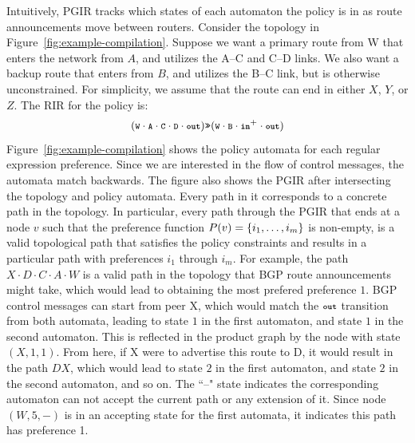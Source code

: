 Intuitively, PGIR tracks which states of each automaton the policy is in as route announcements move between routers.
%
Consider the topology in Figure~\ref{fig:example-compilation}. Suppose we want a primary route from W that enters the network from $A$, and utilizes the A--C and C--D links. We also want a backup route that enters from $B$, and utilizes the B--C link, but is otherwise unconstrained. For simplicity, we assume that the route can end in either $X$, $Y$, or $Z$. The RIR for the policy is:
%
$$(\CD{W} \cdot \CD{A} \cdot \CD{C} \cdot \CD{D} \cdot \Out) \Prefer (\CD{W} \cdot \CD{B} \cdot \In^+ \cdot \Out)$$
%
Figure~\ref{fig:example-compilation} shows the policy automata for each regular expression preference. Since we are interested in the flow of control messages, the automata match backwards.
%
The figure also shows the PGIR after intersecting the topology and policy automata. Every path in it corresponds to a concrete path in the topology. In particular, every path through the PGIR that ends at a node $v$ such that the preference function $P(v) = \{ i_1, \dots, i_m \} $ is non-empty, is a valid topological path that satisfies the policy constraints and results in a particular path with preferences $i_1$ through $i_m$.
%
For example, the path $X \cdot D \cdot C \cdot A \cdot W$ is a valid path in the topology that BGP route announcements might take, which would lead to obtaining the most prefered preference $1$.
BGP control messages can start from peer X, which would match the $\Out$ transition from both automata, leading to state $1$ in the first automaton, and state $1$ in the second automaton. This is reflected in the product graph by the node with state $(X,1,1)$. From here, if X were to advertise this route to D, it would result in the path $D X$, which would lead to state $2$ in the first automaton, and state $2$ in the second automaton, and so on.
%
The ``--" state indicates the corresponding automaton can not accept the current path or any extension of it. Since node $(W,5,-)$ is in an accepting state for the first automata, it indicates this path has preference 1.



